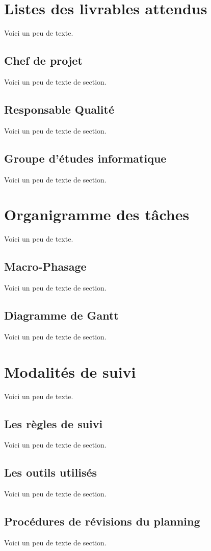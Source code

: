     \chapter{Listes des livrables attendus}
    Voici un peu de texte.
    \section{Chef de projet}
    Voici un peu de texte de section.
    \section{Responsable Qualité}
    Voici un peu de texte de section.
    \section{Groupe d'études informatique}
    Voici un peu de texte de section.
    
    \chapter{Organigramme des tâches}
    Voici un peu de texte.
    \section{Macro-Phasage}
    Voici un peu de texte de section.
    \section{Diagramme de Gantt}
    Voici un peu de texte de section.
    
    \chapter{Modalités de suivi}
    Voici un peu de texte.
    \section{Les règles de suivi}
    Voici un peu de texte de section.
    \section{Les outils utilisés}
    Voici un peu de texte de section.
    \section{Procédures de révisions du planning}
    Voici un peu de texte de section.
    
